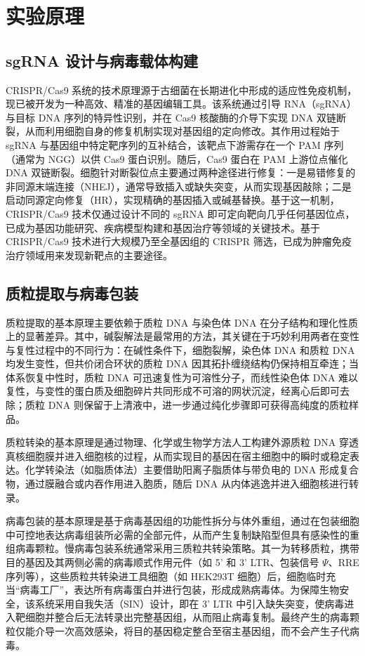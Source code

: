 \section{实验原理}
\subsection{sgRNA 设计与病毒载体构建}
CRISPR/Cas9 系统的技术原理源于古细菌在长期进化中形成的适应性免疫机制，现已被开发为一种高效、精准的基因编辑工具。该系统通过引导 RNA（sgRNA）与目标 DNA 序列的特异性识别，并在 Cas9 核酸酶的介导下实现 DNA 双链断裂，从而利用细胞自身的修复机制实现对基因组的定向修改。其作用过程始于 sgRNA 与基因组中特定靶序列的互补结合，该靶点下游需存在一个 PAM 序列（通常为 NGG）以供 Cas9 蛋白识别。随后，Cas9 蛋白在 PAM 上游位点催化 DNA 双链断裂。细胞针对断裂位点主要通过两种途径进行修复：一是易错修复的非同源末端连接（NHEJ），通常导致插入或缺失突变，从而实现基因敲除；二是启动同源定向修复（HR），实现精确的基因插入或碱基替换。基于这一机制，CRISPR/Cas9 技术仅通过设计不同的 sgRNA 即可定向靶向几乎任何基因位点，已成为基因功能研究、疾病模型构建和基因治疗等领域的关键技术。基于 CRISPR/Cas9 技术进行大规模乃至全基因组的 CRISPR 筛选，已成为肿瘤免疫治疗领域用来发现新靶点的主要途径。

\subsection{质粒提取与病毒包装}
质粒提取的基本原理主要依赖于质粒 DNA 与染色体 DNA 在分子结构和理化性质上的显著差异。其中，碱裂解法是最常用的方法，其关键在于巧妙利用两者在变性与复性过程中的不同行为：在碱性条件下，细胞裂解，染色体 DNA 和质粒 DNA 均发生变性，但共价闭合环状的质粒 DNA 因其拓扑缠绕结构仍保持相互牵连；当体系恢复中性时，质粒 DNA 可迅速复性为可溶性分子，而线性染色体 DNA 难以复性，与变性的蛋白质及细胞碎片共同形成不可溶的网状沉淀，经离心后即可去除；质粒 DNA 则保留于上清液中，进一步通过纯化步骤即可获得高纯度的质粒样品。

质粒转染的基本原理是通过物理、化学或生物学方法人工构建外源质粒 DNA 穿透真核细胞膜并进入细胞核的过程，从而实现目的基因在宿主细胞中的瞬时或稳定表达。化学转染法（如脂质体法）主要借助阳离子脂质体与带负电的 DNA 形成复合物，通过膜融合或内吞作用进入胞质，随后 DNA 从内体逃逸并进入细胞核进行转录。

病毒包装的基本原理是基于病毒基因组的功能性拆分与体外重组，通过在包装细胞中可控地表达病毒组装所必需的全部元件，从而产生复制缺陷型但具有感染性的重组病毒颗粒。慢病毒包装系统通常采用三质粒共转染策略。其一为转移质粒，携带目的基因及其两侧必需的病毒顺式作用元件（如 5' 和 3' LTR、包装信号 \(\Psi\)、RRE 序列等），这些质粒共转染进工具细胞（如 HEK293T 细胞）后，细胞临时充当``病毒工厂''，表达所有病毒蛋白并进行包装，形成成熟病毒体。为保障生物安全，该系统采用自我失活（SIN）设计，即在 3' LTR 中引入缺失突变，使病毒进入靶细胞并整合后无法转录出完整基因组，从而阻止病毒复制。最终产生的病毒颗粒仅能介导一次高效感染，将目的基因稳定整合至宿主基因组，而不会产生子代病毒。

